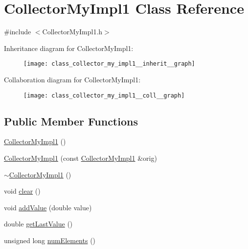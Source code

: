 \hypertarget{class_collector_my_impl1}{\section{Collector\-My\-Impl1 Class Reference}
\label{class_collector_my_impl1}
}


{\ttfamily \#include $<$Collector\-My\-Impl1.\-h$>$}



Inheritance diagram for Collector\-My\-Impl1\-:\nopagebreak
\begin{figure}[H]
\begin{center}
\leavevmode
\texttt{[image: class\_collector\_my\_impl1\_\_inherit\_\_graph]}
\end{center}
\end{figure}


Collaboration diagram for Collector\-My\-Impl1\-:\nopagebreak
\begin{figure}[H]
\begin{center}
\leavevmode
\texttt{[image: class\_collector\_my\_impl1\_\_coll\_\_graph]}
\end{center}
\end{figure}
\subsection*{Public Member Functions}
\begin{DoxyCompactItemize}
\item 
\hyperlink{class_collector_my_impl1_ab8d5d86d5d28f0cc3a4558fe5a6da56c}{Collector\-My\-Impl1} ()
\item 
\hyperlink{class_collector_my_impl1_a7d96fa7024ff2e2158613c4b55ea052f}{Collector\-My\-Impl1} (const \hyperlink{class_collector_my_impl1}{Collector\-My\-Impl1} \&orig)
\item 
\hyperlink{class_collector_my_impl1_a431e418b9b2cf55e6fb10ba688ae281e}{$\sim$\-Collector\-My\-Impl1} ()
\item 
void \hyperlink{class_collector_my_impl1_a9b570931955cafde878d6734aa914039}{clear} ()
\item 
void \hyperlink{class_collector_my_impl1_acc5d658a3429af8b7d4265cbc37485b5}{add\-Value} (double value)
\item 
double \hyperlink{class_collector_my_impl1_a56e754ba3175e2f335290e2a737e7104}{get\-Last\-Value} ()
\item 
unsigned long \hyperlink{class_collector_my_impl1_a25427d84682943e0f588d494c54f79d8}{num\-Elements} ()
\end{DoxyCompactItemize}


